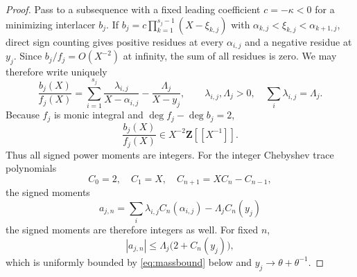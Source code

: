 \documentclass[11pt,reqno]{amsart}
\theoremstyle{definition}
\theoremstyle{remark}
\newcommand{\Z}{\mathbf Z}
\begin{document}
\begin{proof}
Pass to a subsequence with a fixed leading coefficient
$c=-\kappa<0$ for a minimizing interlacer $b_j$.  If
$b_j=c\prod_{k=1}^{s_j-1}(X-\xi_{k,j})$ with
$\alpha_{k,j}<\xi_{k,j}<\alpha_{k+1,j}$, direct sign counting gives positive
residues at every $\alpha_{i,j}$ and a negative residue at $y_j$.  Since
$b_j/f_j=O(X^{-2})$ at infinity, the sum of all residues is zero.  We may
therefore write uniquely
\begin{equation}\label{eq:signedresidues}
 \frac{b_j(X)}{f_j(X)}=
 \sum_{i=1}^{s_j}\frac{\lambda_{i,j}}{X-\alpha_{i,j}}
 -\frac{\Lambda_j}{X-y_j},\qquad
 \lambda_{i,j},\Lambda_j>0,\quad
 \sum_i\lambda_{i,j}=\Lambda_j.
\end{equation}
Because $f_j$ is monic integral and $\deg f_j-\deg b_j=2$,
\[
 \frac{b_j(X)}{f_j(X)}\in X^{-2}\Z[[X^{-1}]].
\]
Thus all signed power moments are integers.  For the integer Chebyshev trace
polynomials
\[
 C_0=2,\quad C_1=X,\quad C_{n+1}=XC_n-C_{n-1},
\]
the signed moments
\begin{equation}\label{eq:integercheb}
 a_{j,n}=\sum_i\lambda_{i,j}C_n(\alpha_{i,j})
 -\Lambda_jC_n(y_j)
\end{equation}
the signed moments are therefore integers as well.  For fixed $n$,
\begin{equation}\label{eq:momentbound}
 |a_{j,n}|\le\Lambda_j\bigl(2+C_n(y_j)\bigr),
\end{equation}
which is uniformly bounded by \eqref{eq:massbound} below and
$y_j\to\theta+\theta^{-1}$.


\end{proof}
\end{document}
